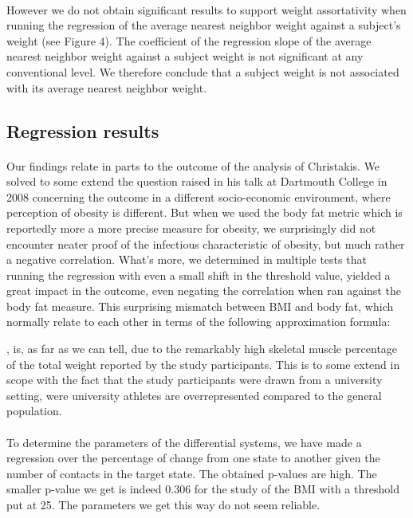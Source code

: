 \documentclass[11pt]{article}
\begin{document}
\paragraph{}
However we do not obtain significant results to support weight assortativity when running the regression of the average nearest neighbor weight against a subject's weight (see Figure 4). The coefficient of the regression slope of the average nearest neighbor weight against a subject weight is not significant at any conventional level. We therefore conclude that a subject weight is not associated with its average nearest neighbor weight. 


\subsection{Regression results}
\paragraph{}
Our findings relate in parts to the outcome of the analysis of Christakis. We solved to some extend the question raised in his talk at Dartmouth College in 2008 concerning the outcome in a different socio-economic environment, where perception of obesity is different. But when we used the body fat metric which is reportedly more a more precise measure for obesity, we surprisingly did not encounter neater proof of the infectious characteristic of obesity, but much rather a negative correlation. What's more, we determined in multiple tests that running the regression with even a small shift in the threshold value, yielded a great impact in the outcome, even negating the correlation when ran against the body fat measure. This surprising mismatch between BMI and body fat, which normally relate to each other in terms of the following approximation formula:


, is, as far as we can tell, due  to the remarkably high skeletal muscle percentage of the total weight reported by the study participants. This is to some extend in scope with the fact that the study participants were drawn from a university setting, were university athletes are overrepresented compared to the general population. 

\paragraph{}
To determine the parameters of the differential systems, we have made a regression over the percentage of change from one state to another given the number of contacts in the target state. The obtained p-values are high. The smaller p-value we get is indeed 0.306 for the study of the BMI with a threshold put at 25. The parameters we get this way do not seem reliable. 
\end{document}

